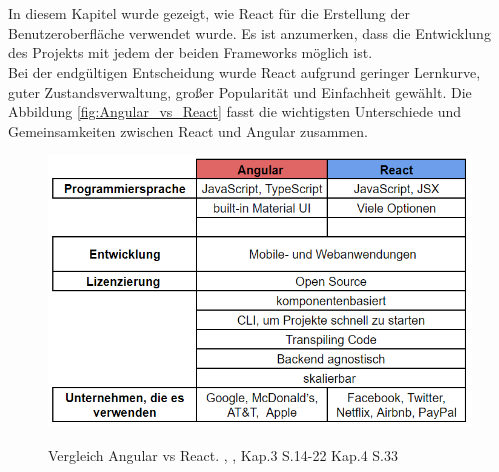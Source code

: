 \\\\%
In diesem Kapitel wurde gezeigt, wie React für die Erstellung der Benutzeroberfläche verwendet wurde. Es ist anzumerken, dass die Entwicklung des Projekts mit jedem der beiden Frameworks möglich ist.\\
Bei der endgültigen Entscheidung wurde React aufgrund geringer Lernkurve, guter Zustandsverwaltung, großer Popularität und Einfachheit gewählt.
Die Abbildung \autoref{fig:Angular_vs_React} fasst die wichtigsten Unterschiede und Gemeinsamkeiten zwischen React und Angular zusammen.
 
  \begin{figure}[h!]
    \centering
    \includegraphics[scale=0.7]{sources/Angular_vs_React}
    \caption[Vergleich Angular vs React]{}
    \label{fig:Angular_vs_React} 
    Vergleich Angular vs React.
    \cite{AvsR}, {\cite{E01}, Kap.3 S.14-22 Kap.4 S.33}
  \end{figure}